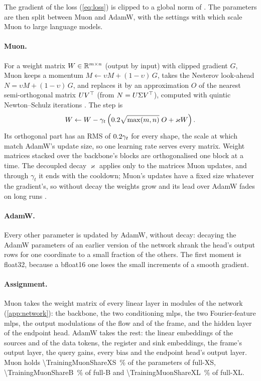 The gradient of the loss (\cref{eq:loss}) is clipped to a global norm of \TrainingClipNorm{}. The
parameters are then split between Muon \citep{jordan2024muon} and AdamW, with the settings with
which \citet{liu2025muon} scale Muon to large language models.

\paragraph{Muon.}
For a weight matrix $W \in \mathbb{R}^{m \times n}$ (output by input) with clipped gradient $G$, Muon keeps
a momentum $M \leftarrow \upsilon M + (1-\upsilon)\, G$, takes the Nesterov look-ahead $N =
\upsilon M + (1-\upsilon)\, G$, and replaces it by an approximation $O$ of the nearest
semi-orthogonal matrix $UV^{\top}$ (from $N = U\Sigma V^{\top}$), computed with \TrainingNewtonSchulzWord{}
quintic Newton--Schulz iterations \citep{jordan2024muon}. The step is
\begin{equation}
  W \leftarrow W - \gamma_t \left(0.2{}\sqrt{\max(m, n)}\; O + \varkappa W\right).
  \label{eq:training-muon}
\end{equation}
Its orthogonal part has an RMS of $0.2{}\gamma_t$ for every shape, the scale at which
\citet{liu2025muon} match AdamW's update size, so one learning rate serves every matrix. Weight
matrices stacked over the backbone's blocks are orthogonalised one block at a time. The decoupled
decay $\varkappa$ applies only to the matrices Muon updates, and through $\gamma_t$ it ends with the
cooldown; Muon's updates have a fixed size whatever the gradient's, so without decay the weights
grow and its lead over AdamW fades on long runs \citep{liu2025muon}.

\paragraph{AdamW.}
Every other parameter is updated by AdamW, without decay: decaying the AdamW parameters of an
earlier version of the network shrank the head's output rows for one coordinate to a small fraction
of the others. The first moment is float32, because a bfloat16 one loses the small increments of a
smooth gradient.

\paragraph{Assignment.}
Muon takes the weight matrix of every linear layer in \TrainingMuonFieldCount{} modules of the
network (\cref{app:network}): the backbone, the two conditioning \acp{mlp}, the two Fourier-feature
\acp{mlp}, the output modulations of the flow and of the frame, and the hidden layer of the
endpoint head. AdamW takes the rest: the linear embeddings of the sources and of the data tokens,
the register and sink embeddings, the frame's output layer, the query gains, every bias and the
endpoint head's output layer. Muon holds \qty{\TrainingMuonShareXS}{\percent} of the parameters of
full-XS, \qty{\TrainingMuonShareB}{\percent} of full-B and \qty{\TrainingMuonShareXL}{\percent} of
full-XL.

